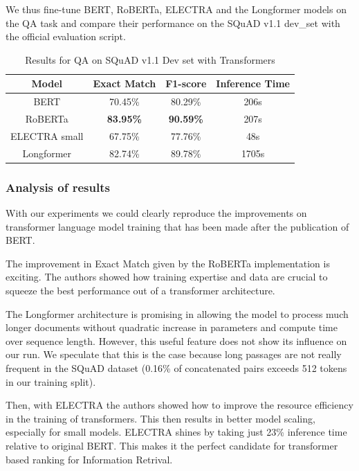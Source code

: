\documentclass{article}
\begin{document}
We thus fine-tune BERT, RoBERTa, ELECTRA and the Longformer models on the QA task and compare their performance on the SQuAD v1.1 dev\_set with the official evaluation script.
\begin{table}[h]
\centering
\caption{Results for QA on SQuAD v1.1 Dev set with Transformers}\label{tab1}

\begin{tabular}{| c | c | c | c |}
\hline
Model &  Exact Match & F1-score & Inference Time\\
\hline
BERT &  70.45\% & 80.29\% & 206s \\

\hline
RoBERTa &  \textbf{83.95\%} & \textbf{90.59\%} & 207s\\

\hline
ELECTRA  small &  67.75\% & 77.76\% & 48s\\

\hline
Longformer &  82.74\% & 89.78\% & 1705s\\

\hline
\end{tabular}
\end{table}

\subsubsection{Analysis of results}

With our experiments we could clearly reproduce the improvements on transformer language model training that has been made after the publication of BERT.

The improvement in Exact Match given by the RoBERTa implementation is exciting. The authors showed how training expertise and data are crucial to squeeze the best performance out of a transformer architecture.

The Longformer architecture is promising in allowing the model to process much longer documents without quadratic increase in parameters and compute time over sequence length. However, this useful feature does not show its influence on our run. We speculate that this is the case because long passages are not really frequent in the SQuAD dataset (0.16\% of concatenated pairs exceeds 512 tokens in our training split).

Then, with ELECTRA the authors showed how to improve the resource efficiency in the training of transformers. This then results in better model scaling, especially for small models. 
ELECTRA shines by taking just 23\% inference time relative to original BERT. This makes it the perfect candidate for transformer based ranking for Information Retrival.
\end{document}
